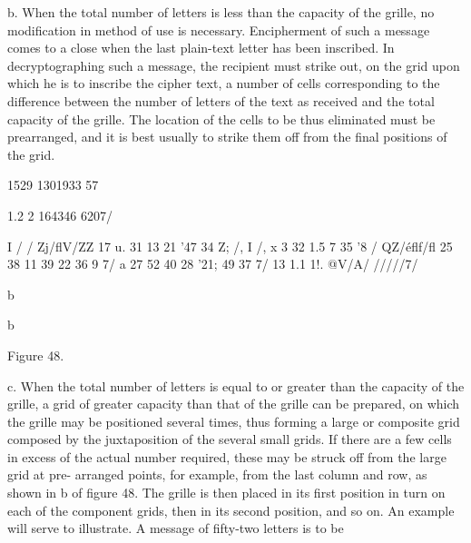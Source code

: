 b. When the total number of letters is less than the capacity of the
grille, no modiﬁcation in method of use is necessary. Encipherment of
such a message comes to a close when the last plain-text letter has been
inscribed. In decryptographing such a message, the recipient must strike
out, on the grid upon which he is to inscribe the cipher text, a number of
cells corresponding to the difference between the number of letters of
the text as received and the total capacity of the grille. The location of
the cells to be thus eliminated must be prearranged, and it is best usually
to strike them off from the ﬁnal positions of the grid.

1529 1301933 57

1.2 2 164346 6207/

I / /
Zj/ﬂV/ZZ 17 u. 31 13 21 '47 34 Z;
/, I /, x 3 32 1.5 7 35 '8 /
QZ/éﬂf/ﬂ 25 38 11 39 22 36 9 7/
a 27 52 40 28 ’21; 49 37 7/
13 1.1 1!. @V/A/ /////7/

b

 

 

 

 

 

 

 

b

 

 

 

 

 

 

 

 

 

 

 

 

 

 

 

 

 

 

 

 

 

 

Figure 48.

c. When the total number of letters is equal to or greater than the
capacity of the grille, a grid of greater capacity than that of the grille
can be prepared, on which the grille may be positioned several times,
thus forming a large or composite grid composed by the juxtaposition
of the several small grids. If there are a few cells in excess of the actual
number required, these may be struck off from the large grid at pre-
arranged points, for example, from the last column and row, as shown
in b of ﬁgure 48. The grille is then placed in its ﬁrst position in turn on
each of the component grids, then in its second position, and so on. An
example will serve to illustrate. A message of ﬁfty-two letters is to be

